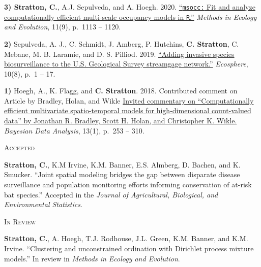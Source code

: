 \documentclass[a4paper]{article}
\newcommand{\subheader} [1] {
	{\hspace*{-9pt}\vspace*{6pt} \textcolor{Cerulean}{\textsc{#1}}}
	\vspace*{-6pt}
}
\begin{document}
\textbf{3) Stratton, C.}, A.J. Sepulveda, and A. Hoegh. 2020.
\href{https://doi.org/10.1111/2041-210X.13442}{``\texttt{msocc:} Fit and
analyze computationally efficient multi-scale occupancy models in
\texttt{R}.''} \textit{Methods in Ecology and Evolution}, 11(9), p.~1113
-- 1120. \vspace*{2mm}

\textbf{2)} Sepulveda, A. J., C. Schmidt, J. Amberg, P. Hutchins,
\textbf{C. Stratton}, C. Mebane, M. B. Laramie, and D. S. Pilliod. 2019.
\href{https://doi.org/10.1002/ecs2.2843}{``Adding invasive species
biosurveillance to the U.S. Geological Survey streamgage network.''}
\textit{Ecosphere}, 10(8), p.~1 -- 17. \vspace*{2mm}

\textbf{1)} Hoegh, A., K. Flagg, and \textbf{C. Stratton}. 2018.
Contributed comment on Article by Bradley, Holan, and Wikle
\href{https://eds.p.ebscohost.com/abstract?site=eds\&scope=site\&jrnl=19360975\&AN=138950462\&h=fupOc1pyeH8dv67mdPoRzhYvo96LS\%2bzCYNHIjAcMPojnVBydkua\%2fXFU6RanU78MDh8WNMlzPVI\%2fBxvaUiWvg\%2bw\%3d\%3d\&crl=c\&resultLocal=ErrCrlNoResults\&resultNs=Ehost\&crlhashurl=login.aspx\%3fdirect\%3dtrue\%26profile\%3dehost\%26scope\%3dsite\%26authtype\%3dcrawler\%26jrnl\%3d19360975\%26AN\%3d138950462}{Invited
commentary on ``Computationally efficient multivariate spatio-temporal
models for high-dimensional count-valued data'' by Jonathan R. Bradley,
Scott H. Holan, and Christopher K. Wikle.}
\textit{Bayesian Data Analysis}, 13(1), p.~253 -- 310. \vspace*{2mm}

\subheader{Accepted}
\vspace*{2mm}

\textbf{Stratton, C.}, K.M Irvine, K.M. Banner, E.S. Almberg, D. Bachen,
and K. Smucker. ``Joint spatial modeling bridges the gap between
disparate disease surveillance and population monitoring efforts
informing conservation of at-risk bat species.'' Accepted in the
\textit{Journal of Agricultural, Biological, and Environmental Statistics}.
\vspace*{2mm}

\subheader{In Review}
\vspace*{2mm}

\textbf{Stratton, C.}, A. Hoegh, T.J. Rodhouse, J.L. Green, K.M. Banner,
and K.M. Irvine. ``Clustering and unconstrained ordination with
Dirichlet process mixture models.'' In review in
\textit{Methods in Ecology and Evolution}. \vspace*{2mm}
\end{document}
